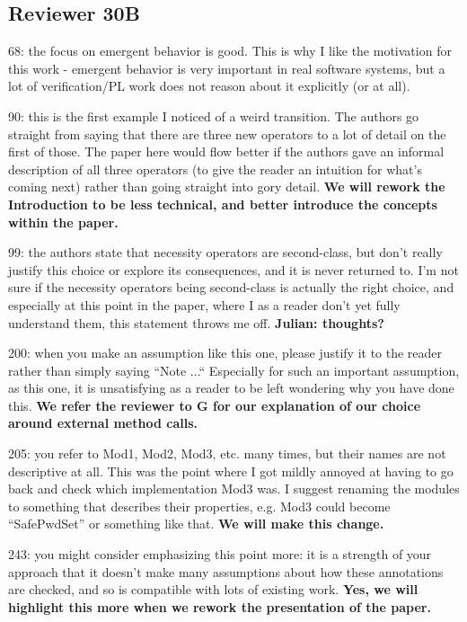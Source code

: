 \documentclass[11pt]{amsart}
\newcommand{\us}[1]{\bf #1}
\begin{document}
   
  \subsection*{Reviewer 30B}
  
   68: the focus on emergent behavior is good. This is why I like the motivation for this work - emergent behavior is very important in real software systems, but a lot of verification/PL work does not reason about it explicitly (or at all).

90: this is the first example I noticed of a weird transition. The authors go straight from saying that there are three new operators to a lot of detail on the first of those. The paper here would flow better if the authors gave an informal description of all three operators (to give the reader an intuition for what’s coming next) rather than going straight into gory detail.
{\us{We will rework the Introduction to be less technical, and better introduce the concepts within the paper.}}

99: the authors state that necessity operators are second-class, but don’t really justify this choice or explore its consequences, and it is never returned to. I’m not sure if the necessity operators being second-class is actually the right choice, and especially at this point in the paper, where I as a reader don’t yet fully understand them, this statement throws me off.
{\us{Julian: thoughts?}}

200: when you make an assumption like this one, please justify it to the reader rather than simply saying “Note ...“ Especially for such an important assumption, as this one, it is unsatisfying as a reader to be left wondering why you have done this.
{\us{We refer the reviewer to G for our explanation of our choice around external method calls.}}

205: you refer to Mod1, Mod2, Mod3, etc. many times, but their names are not descriptive at all. This was the point where I got mildly annoyed at having to go back and check which implementation Mod3 was. I suggest renaming the modules to something that describes their properties, e.g. Mod3 could become “SafePwdSet” or something like that.
{\us{We will make this change.}}

243: you might consider emphasizing this point more: it is a strength of your approach that it doesn’t make many assumptions about how these annotations are checked, and so is compatible with lots of existing work.
{\us{Yes, we will highlight this more when we rework the presentation of the paper.}}
\end{document}
